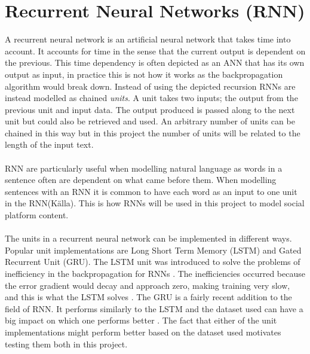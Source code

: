 \section{Recurrent Neural Networks (RNN)}
A recurrent neural network is an artificial neural network that takes time into account. It accounts for time in the sense that the current output is dependent on the previous. This time dependency is often depicted as an ANN that has its own output as input, in practice this is not how it works as the backpropagation algorithm would break down. Instead of using the depicted recursion RNNs are instead modelled as chained \textit{units}. A unit takes two inputs; the output from the previous unit and input data. The output produced is passed along to the next unit but could also be retrieved and used. An arbitrary number of units can be chained in this way but in this project the number of units will be related to the length of the input text. 
\\\\
RNN are particularly useful when modelling natural language as words in a sentence often are dependent on what came before them. When modelling sentences with an RNN it is common to have each word as an input to one unit in the RNN(Källa). This is how RNNs will be used in this project to model social platform content.
\\\\
The units in a recurrent neural network can be implemented in different ways. Popular unit implementations are Long Short Term Memory (LSTM) and Gated Recurrent Unit (GRU). The LSTM unit was introduced to solve the problems of inefficiency in the backpropagation for RNNs \parencite{LSTMdefined}. The inefficiencies occurred because the error gradient would decay and approach zero, making training very slow, and this is what the LSTM solves \parencite{hochreiter1998vanishing}. The GRU is a fairly recent addition to the field of RNN. It performs similarly to the LSTM and the dataset used can have a big impact on which one performs better \parencite{GRUchung2014empirical}. The fact that either of the unit implementations might perform better based on the dataset used motivates testing them both in this project.

